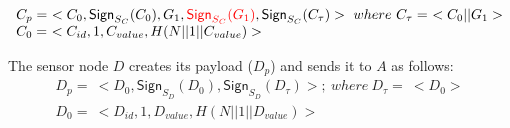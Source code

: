 		\begin{equation}
			\begin{array}{l}
				C_{p} =\ <C_{0},\textsf{Sign}_{S_{C}}(C_{0}),G_{1},\textcolor{red}{\textsf{Sign}_{S_{C}}(G_{1})}, \textsf{Sign}_{S_{C}}(C_{\tau})>\ where\ C_{\tau} =\ <C_{0} || G_{1}>\\
				C_{0} =\ <C_{id}, 1, C_{value}, H(N||1||C_{value})>
			\end{array}
			\label{eq:c-payload}
		\end{equation}

		The sensor node $D$ creates its payload ($D_{p}$) and sends it to $A$ as follows:
		\begin{equation}
			\begin{array}{l}
				D_{p} =\ <D_{0}, \textsf{Sign}_{S_{D}}(D_{0}), \textsf{Sign}_{S_{D}}(D_{\tau})>;\ where\ D_{\tau} =\ <D_{0}>\\
				D_{0} =\ <D_{id},1,D_{value},H(N||1||D_{value})>
			\end{array}
			\label{eq:d-payload}
		\end{equation}

